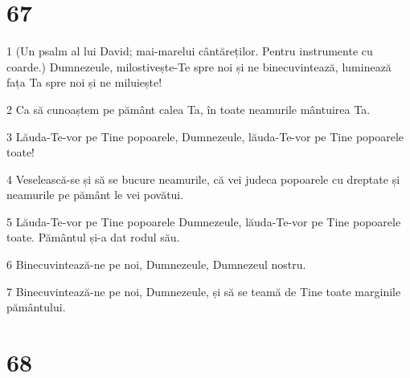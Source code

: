 \chapter{67}

\par 1 (Un psalm al lui David; mai-marelui cântăreților. Pentru instrumente cu coarde.) Dumnezeule, milostivește-Te spre noi și ne binecuvintează, luminează fața Ta spre noi și ne miluiește!
\par 2 Ca să cunoaștem pe pământ calea Ta, în toate neamurile mântuirea Ta.
\par 3 Lăuda-Te-vor pe Tine popoarele, Dumnezeule, lăuda-Te-vor pe Tine popoarele toate!
\par 4 Veselească-se și să se bucure neamurile, că vei judeca popoarele cu dreptate și neamurile pe pământ le vei povătui.
\par 5 Lăuda-Te-vor pe Tine popoarele Dumnezeule, lăuda-Te-vor pe Tine popoarele toate. Pământul și-a dat rodul său.
\par 6 Binecuvintează-ne pe noi, Dumnezeule, Dumnezeul nostru.
\par 7 Binecuvintează-ne pe noi, Dumnezeule, și să se teamă de Tine toate marginile pământului.

\chapter{68}


